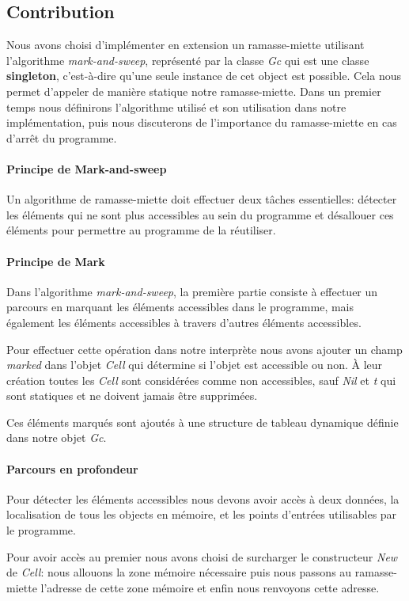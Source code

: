 \subsection{Contribution}
Nous avons choisi d'implémenter en extension un ramasse-miette
utilisant l'algorithme \emph{mark-and-sweep}, représenté par la classe
\emph{Gc} qui est une classe \textbf{singleton}, c'est-à-dire qu'une
seule instance de cet object est possible. Cela nous permet d'appeler
de manière statique notre ramasse-miette.  Dans un premier temps nous
définirons l'algorithme utilisé et son utilisation dans notre
implémentation, puis nous discuterons de l'importance du
ramasse-miette en cas d'arrêt du programme.

\paragraph{Principe de Mark-and-sweep} 
Un algorithme de ramasse-miette doit effectuer deux tâches
essentielles: détecter les éléments qui ne sont plus accessibles au
sein du programme et désallouer ces éléments pour permettre au
programme de la réutiliser.

\paragraph{Principe de Mark}
Dans l'algorithme \emph{mark-and-sweep}, la première partie consiste à
effectuer un parcours en marquant les éléments accessibles dans le
programme, mais également les éléments accessibles à travers d'autres
éléments accessibles.

Pour effectuer cette opération dans notre interprète nous avons
ajouter un champ \emph{marked} dans l'objet \emph{Cell} qui détermine
si l'objet est accessible ou non. À leur création toutes les
\emph{Cell} sont considérées comme non accessibles, sauf \emph{Nil} et
\emph{t} qui sont statiques et ne doivent jamais être supprimées.

Ces éléments marqués sont ajoutés à une structure de tableau dynamique
définie dans notre objet \emph{Gc}.


\paragraph{Parcours en profondeur}
Pour détecter les éléments accessibles nous devons avoir accès à deux
données, la localisation de tous les objects en mémoire, et les points
d'entrées utilisables par le programme.

Pour avoir accès au premier nous avons choisi de surcharger le
constructeur \emph{New} de \emph{Cell}: nous allouons la zone mémoire
nécessaire puis nous passons au ramasse-miette l'adresse de cette zone
mémoire et enfin nous renvoyons cette adresse.

